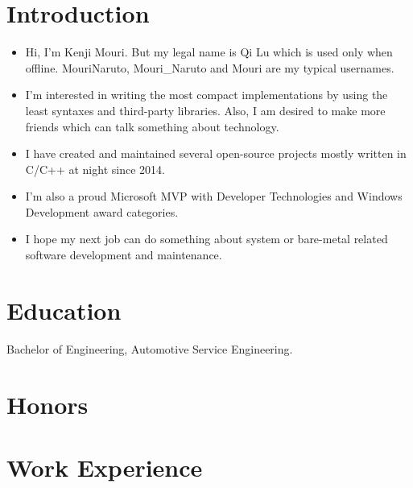 \documentclass{resume}
\begin{document}
\renewcommand\headrulewidth{0pt}



\section{Introduction}
\begin{itemize}
  \item Hi, I'm Kenji Mouri. But my legal name is Qi Lu which is used only when offline. MouriNaruto, Mouri\_Naruto and Mouri are my typical usernames.
  \item I'm interested in writing the most compact implementations by using the least syntaxes and third-party libraries. Also, I am desired to make more friends which can talk something about technology.
  \item I have created and maintained several open-source projects mostly written in C/C++ at night since 2014.
  \item I'm also a proud Microsoft MVP with Developer Technologies and Windows Development award categories.
  \item I hope my next job can do something about system or bare-metal related software development and maintenance.
\end{itemize}

\section{Education}

  Bachelor of Engineering, Automotive Service Engineering.

\section{Honors}


\section{Work Experience}
\end{document}
